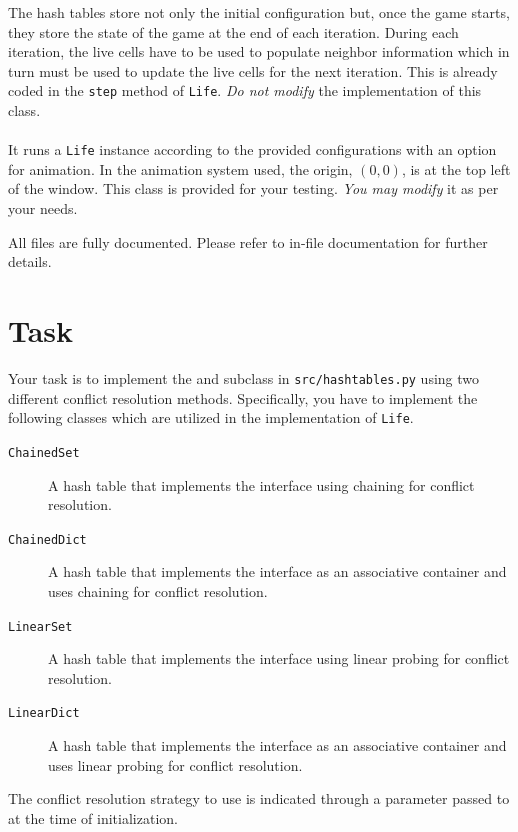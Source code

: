 \documentclass[addpoints]{exam}
\begin{document}
The hash tables store not only the initial configuration but, once the game starts, they store the state of the game at the end of each iteration. During each iteration, the live cells have to be used to populate neighbor information which in turn must be used to update the live cells for the next iteration. This is already coded in the \texttt{step} method of \texttt{Life}. \textit{Do not modify} the implementation of this class.

\paragraph{} It runs a \texttt{Life} instance according to the provided configurations with an option for animation. In the animation system used, the origin, $(0,0)$, is at the top left of the window. This class is provided for your testing. \textit{You may modify} it as per your needs.


All files are fully documented. Please refer to in-file documentation for further details.

\section*{Task}

Your task is to implement the  and  subclass in \texttt{src/hashtables.py} using two different conflict resolution methods. Specifically, you have to implement the following classes which are utilized in the implementation of \texttt{Life}.
\begin{description}
  \item[\texttt{ChainedSet}] A hash table that implements the  interface using chaining for conflict resolution.
  \item[\texttt{ChainedDict}] A hash table that implements the  interface as an associative container and uses chaining for conflict resolution.
  \item[\texttt{LinearSet}] A hash table that implements the  interface using linear probing for conflict resolution.
  \item[\texttt{LinearDict}] A hash table that implements the  interface as an associative container and uses linear probing for conflict resolution.
\end{description}
The conflict resolution strategy to use is indicated through a parameter passed to  at the time of initialization.
\end{document}
